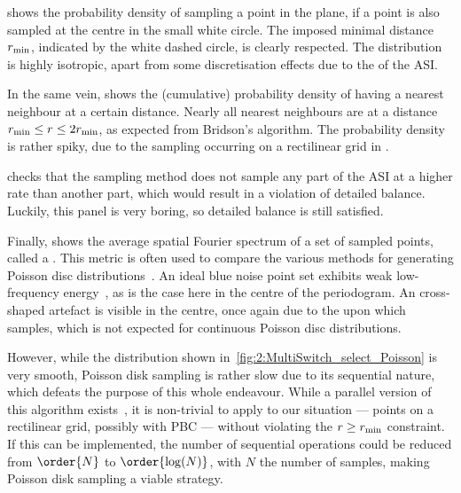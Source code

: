  shows the probability density of sampling a point in the plane, if a point is also sampled at the centre in the small white circle.
The imposed minimal distance $r_\mathrm{min}$, indicated by the white dashed circle, is clearly respected.
The distribution is highly isotropic, apart from some discretisation effects due to the  of the ASI. \par
In the same vein,  shows the (cumulative) probability density of having a nearest neighbour at a certain distance.
Nearly all nearest neighbours are at a distance $r_\mathrm{min} \leq r \leq 2r_\mathrm{min}$, as expected from Bridson's algorithm.
The probability density is rather spiky, due to the sampling occurring on a rectilinear grid in \hotspice. \par
{} checks that the sampling method does not sample any part of the ASI at a higher rate than another part, which would result in a violation of detailed balance.
Luckily, this panel is very boring, so detailed balance is still satisfied. \par
Finally,  shows the average spatial Fourier spectrum of a set of sampled points, called a .
This metric is often used to compare the various methods for generating Poisson disc distributions~\cite{PoissonDiskComparison}.
An ideal blue noise point set exhibits weak low-frequency energy~\cite{EfficientBlueNoisePointSets}, as is the case here in the centre of the periodogram.
An cross-shaped artefact is visible in the centre, once again due to the  upon which \hotspice samples, which is not expected for continuous Poisson disc distributions. \\\par

However, while the distribution shown in~\cref{fig:2:MultiSwitch_select_Poisson} is very smooth, Poisson disk sampling is rather slow due to its sequential nature, which defeats the purpose of this whole  endeavour.
While a parallel version of this algorithm exists~\cite{PoissonDiskParallel}, it is non-trivial to apply to our situation --- points on a rectilinear grid, possibly with PBC --- without violating the $r \geq r_\mathrm{min}$ constraint. %
If this can be implemented, the number of sequential operations could be reduced from $\order{N}$ to $\order{\log(N)}$, with $N$ the number of samples, making Poisson disk sampling a viable strategy.


